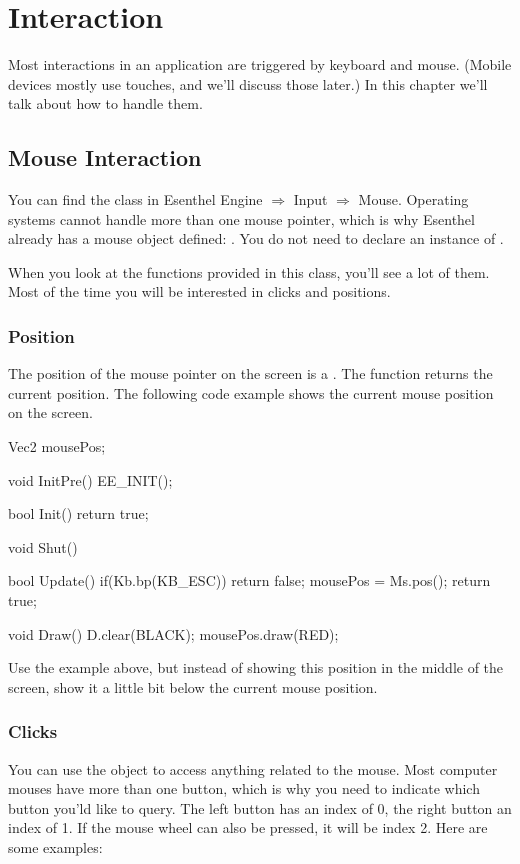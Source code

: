 \chapter{Interaction}
Most interactions in an application are triggered by keyboard and mouse. (Mobile devices mostly use touches, and we'll discuss those later.) In this chapter we'll talk about how to handle them.

\section{Mouse Interaction}
You can find the class  in Esenthel Engine $\Rightarrow$ Input $\Rightarrow$ Mouse. Operating systems cannot handle more than one mouse pointer, which is why Esenthel already has a mouse object defined: . You do not need to declare an instance of .

When you look at the functions provided in this class, you'll see a lot of them. Most of the time you will be interested in clicks and positions.

\subsection{Position}
The position of the mouse pointer on the screen is a . The function  returns the current position. The following code example shows the current mouse position on the screen. 


\begin{code}
Vec2 mousePos;

void InitPre()
{
   EE_INIT();
}

bool Init()
{   
   return true;
}

void Shut() {}

bool Update()
{
   if(Kb.bp(KB_ESC)) return false;  
   mousePos = Ms.pos();  
   return true;
}

void Draw()
{
   D.clear(BLACK);
   mousePos.draw(RED);
}
\end{code}

\begin{exercise}
Use the example above, but instead of showing this position in the middle of the screen, show it a little bit below the current mouse position.
\end{exercise} 

\subsection{Clicks}
You can use the  object to access anything related to the mouse. Most computer mouses have more than one button, which is why you need to indicate which button you'ld like to query. The left button has an index of 0, the right button an index of 1. If the mouse wheel can also be pressed, it will be index 2. Here are some examples: 

